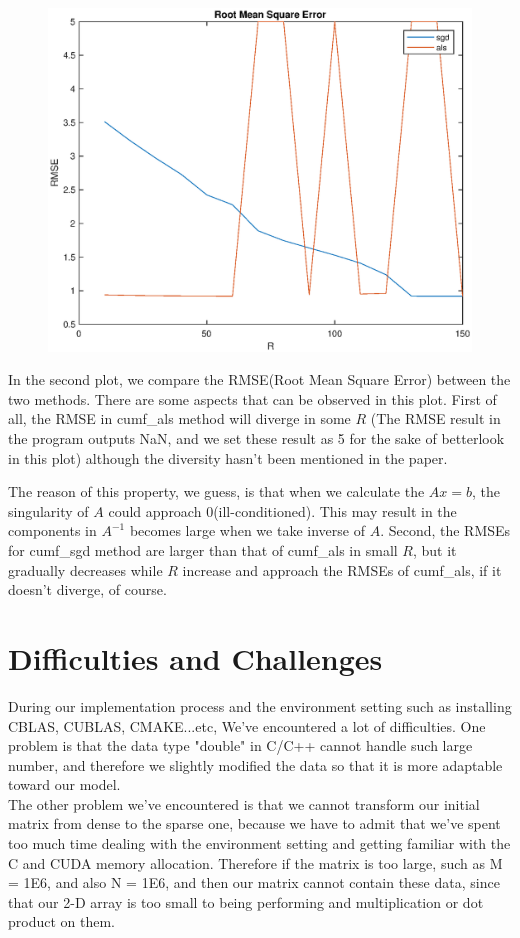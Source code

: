 \documentclass[12pt]{article}
\theoremstyle{remark}
\begin{document}
\begin{CJK}{UTF8}{bsmi}
\begin{figure}[H]
\begin{center}
        \includegraphics[width=500pt]{rmse.eps}
        \label{fig:arch_02}
    \end{center}
\end{figure}
In the second plot, we compare the RMSE(Root Mean Square Error) between the two methods.  There are some aspects that can be observed in this plot.  First of all, the RMSE in cumf\_als method will diverge in some $R$ (The RMSE result in the program outputs NaN, and we set these result as 5 for the sake of better\-look in this plot) although the diversity hasn’t been mentioned in the paper.

  The reason of this property, we guess, is that when we calculate the $Ax=b$, the singularity of $A$ could approach 0(ill-conditioned).  This may result in the components in $A^{-1}$ becomes large when we take inverse of $A$.  Second, the RMSEs for cumf\_sgd method are larger than that of cumf\_als in small $R$, but it gradually decreases while $R$ increase and approach the RMSEs of cumf\_als, if it doesn’t diverge, of course.
 \section{Difficulties and Challenges}
During our implementation process and the environment setting such as installing CBLAS, CUBLAS, CMAKE...etc, We've encountered a lot of difficulties. One problem is that the data type "double" in C/C++ cannot handle such large number, and therefore we slightly modified the data so that it is more adaptable toward our model.\\
The other problem we've encountered is that we cannot transform our initial matrix from dense to the sparse one, because we have to admit that we've spent too much time dealing with the environment setting and getting familiar with the C and CUDA memory allocation. Therefore if the matrix is too large, such as M = 1E6, and also N = 1E6, and then our matrix cannot contain these data, since that our 2-D array is too small to being performing and multiplication or dot product on them. 

\end{CJK}
\end{document}
